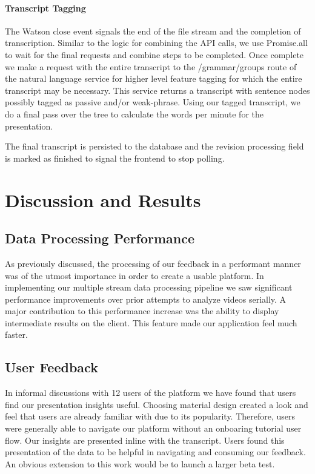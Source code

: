 \paragraph{Transcript Tagging}
The Watson close event signals the end of the file stream and the completion of
transcription. Similar to the logic for combining the API calls, we use
Promise.all to wait for the final requests and combine steps to be completed.
Once complete we make a request with the entire transcript to the
/grammar/groups route of the natural language service for higher level feature
tagging for which the entire transcript may be necessary. This service returns a
transcript with sentence nodes possibly tagged as passive and/or weak-phrase.
Using our tagged transcript, we do a final pass over the tree to calculate the
words per minute for the presentation.

The final transcript is persisted to the database and the revision processing
field is marked as finished to signal the frontend to stop polling.

\section*{Discussion and Results}
\label{chapterdiscussionandresults}

\subsection*{Data Processing Performance}
As previously discussed, the processing of our feedback in a performant manner
was of the utmost importance in order to create a usable platform. In
implementing our multiple stream data processing pipeline we saw significant
performance improvements over prior attempts to analyze videos serially. A major
contribution to this performance increase was the ability to display
intermediate results on the client. This feature made our application feel much
faster.

\subsection*{User Feedback}
In informal discussions with 12 users of the platform we have found that users
find our presentation insights useful. Choosing material design created a look
and feel that users are already familiar with due to its popularity. Therefore,
users were generally able to navigate our platform without an onboaring tutorial
user flow. Our insights are presented inline with the transcript. Users found
this presentation of the data to be helpful in navigating and consuming our
feedback. An obvious extension to this work would be to launch a larger beta
test.

